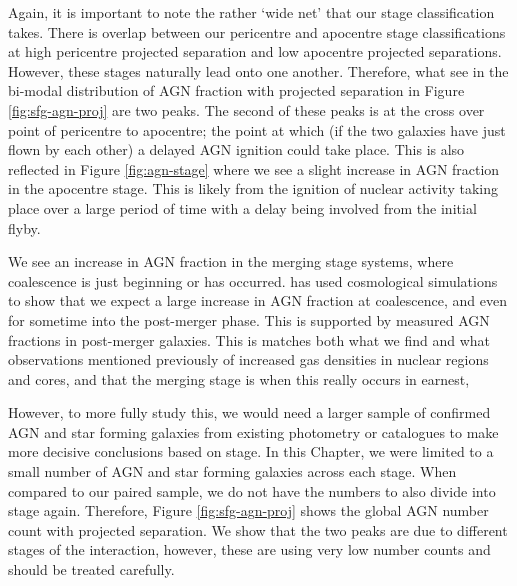 Again, it is important to note the rather `wide net' that our stage classification takes. There is overlap between our pericentre and apocentre stage classifications at high pericentre projected separation and low apocentre projected separations. However, these stages naturally lead onto one another. Therefore, what see in the bi-modal distribution of AGN fraction with projected separation in Figure \ref{fig:sfg-agn-proj} are two peaks. The second of these peaks is at the cross over point of pericentre to apocentre; the point at which (if the two galaxies have just flown by each other) a delayed AGN ignition could take place. This is also reflected in Figure \ref{fig:agn-stage} where we see a slight increase in AGN fraction in the apocentre stage. This is likely from the ignition of nuclear activity taking place over a large period of time with a delay being involved from the initial flyby.

We see an increase in AGN fraction in the merging stage systems, where coalescence is just beginning or has occurred. \citet{2023MNRAS.519.4966B} has used cosmological simulations to show that we expect a large increase in AGN fraction at coalescence, and even for sometime into the post-merger phase. This is supported by measured AGN fractions in post-merger galaxies. This is matches both what we find and what observations mentioned previously of increased gas densities in nuclear regions and cores, and that the merging stage is when this really occurs in earnest,

However, to more fully study this, we would need a larger sample of confirmed AGN and star forming galaxies from existing photometry or catalogues to make more decisive conclusions based on stage. In this Chapter, we were limited to a small number of AGN and star forming galaxies across each stage. When compared to our paired sample, we do not have the numbers to also divide into stage again. Therefore, Figure \ref{fig:sfg-agn-proj} shows the global AGN number count with projected separation. We show that the two peaks are due to different stages of the interaction, however, these are using very low number counts and should be treated carefully.

